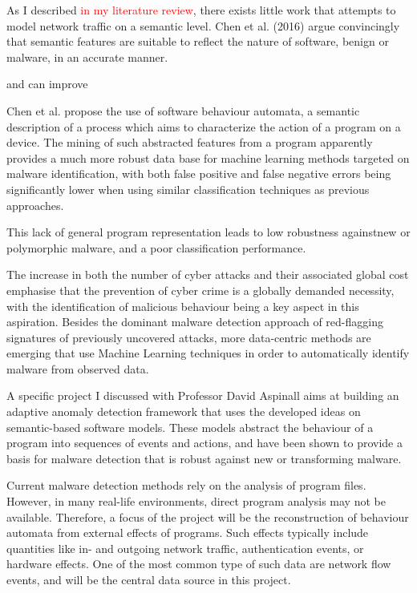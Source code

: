 \documentclass[a4paper,12pt,twoside]{report}
\begin{document}
As I described \textcolor{red}{in my literature review}, there exists little work that attempts to model network traffic on a semantic level. Chen et al.  (2016) \cite{chen2016robust, chen2016more} argue convincingly that semantic features are suitable to reflect the nature of software, benign or malware, in an accurate manner. 

 and can improve 

Chen et al. \cite{chen2016robust, chen2016more} propose the use of software behaviour automata, a semantic description of a process which aims to characterize the action of a program on a device. The mining of such abstracted features from a program apparently provides a much more robust data base for machine learning methods targeted on malware identification, with both false positive and false negative errors being significantly lower when using similar classification techniques as previous approaches.



This lack of general program representation leads to low robustness againstnew or polymorphic malware, and a poor classification performance.  




The increase in both the number of cyber attacks and their associated global cost emphasise that the prevention of cyber crime is a globally demanded necessity, with the identification of malicious behaviour being a key aspect in this aspiration. Besides the dominant malware detection approach of red-flagging signatures of previously uncovered attacks, more data-centric methods are emerging that use Machine Learning techniques in order to automatically identify malware from observed data.%

A specific project I discussed with Professor David Aspinall aims at building an adaptive anomaly detection framework that uses the developed ideas on semantic-based software models. These models abstract the behaviour of a program into sequences  of  events and  actions, and have been shown to provide a  basis for malware detection that is robust against new or transforming malware.

Current malware detection methods rely on the analysis of program files. However, in many real-life environments, direct program analysis may not be available. Therefore, a focus of the project will be the reconstruction of behaviour automata from external effects of programs. Such effects typically include quantities like in- and outgoing network traffic, authentication events, or hardware effects. One of the most common type of such data are network flow events, and will be the central data source in this project.
\end{document}
